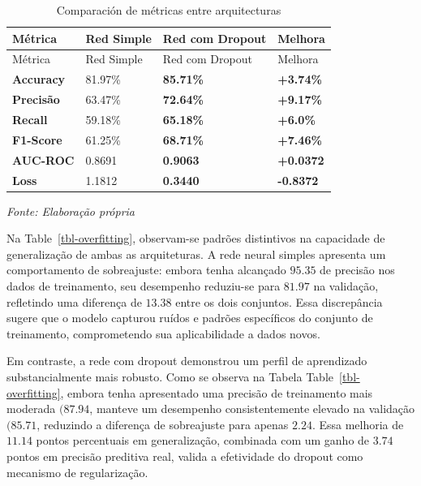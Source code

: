 \documentclass[
  oneclumn]{article}
\begin{document}
\begin{longtable}[]{@{}llll@{}}
\caption{Comparación de métricas entre
arquitecturas}\label{tbl-distribucion}\tabularnewline
\toprule\noalign{}
Métrica & Red Simple & Red com Dropout & Melhora \\
\midrule\noalign{}
\endfirsthead
\toprule\noalign{}
Métrica & Red Simple & Red com Dropout & Melhora \\
\midrule\noalign{}
\endhead
\bottomrule\noalign{}
\endlastfoot
\textbf{Accuracy} & 81.97\% & \textbf{85.71\%} & \textbf{+3.74\%} \\
\textbf{Precisão} & 63.47\% & \textbf{72.64\%} & \textbf{+9.17\%} \\
\textbf{Recall} & 59.18\% & \textbf{65.18\%} & \textbf{+6.0\%} \\
\textbf{F1-Score} & 61.25\% & \textbf{68.71\%} & \textbf{+7.46\%} \\
\textbf{AUC-ROC} & 0.8691 & \textbf{0.9063} & \textbf{+0.0372} \\
\textbf{Loss} & 1.1812 & \textbf{0.3440} & \textbf{-0.8372} \\
\end{longtable}

\begin{center}
\footnotesize \textit{Fonte: Elaboração própria}
\end{center}

Na Table~\ref{tbl-overfitting}, observam-se padrões distintivos na
capacidade de generalização de ambas as arquiteturas. A rede neural
simples apresenta um comportamento de sobreajuste: embora tenha
alcançado \(95.35%
\) de precisão nos dados de treinamento, seu desempenho reduziu-se para
\(81.97%
\) na validação, refletindo uma diferença de \(13.38%
\) entre os dois conjuntos. Essa discrepância sugere que o modelo
capturou ruídos e padrões específicos do conjunto de treinamento,
comprometendo sua aplicabilidade a dados novos.

Em contraste, a rede com dropout demonstrou um perfil de aprendizado
substancialmente mais robusto. Como se observa na Tabela
Table~\ref{tbl-overfitting}, embora tenha apresentado uma precisão de
treinamento mais moderada \((87.94%
\), manteve um desempenho consistentemente elevado na validação
\((85.71%
\), reduzindo a diferença de sobreajuste para apenas \(2.24%
\). Essa melhoria de \(11.14\) pontos percentuais em generalização,
combinada com um ganho de \(3.74\) pontos em precisão preditiva real,
valida a efetividade do dropout como mecanismo de regularização.
\end{document}
